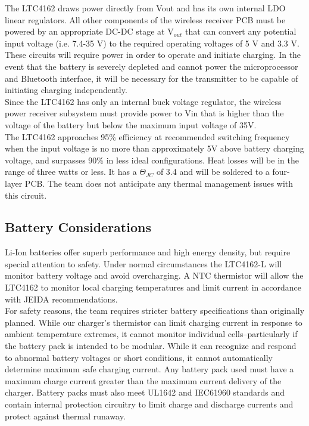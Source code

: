 \documentclass[12pt]{article}
\begin{document}
\indent
The LTC4162 draws power directly from Vout and has its own internal LDO linear regulators. All other components of the wireless receiver PCB must be powered by an appropriate DC-DC stage at V$_{out}$ that can convert any potential input voltage (i.e. 7.4-35 V) to the required operating voltages of 5 V and 3.3 V. These circuits will require power in order to operate and initiate charging. In the event that the battery is severely depleted and cannot power the microprocessor and Bluetooth interface, it will be necessary for the transmitter to be capable of initiating charging independently.\\

\indent
Since the LTC4162 has only an internal buck voltage regulator, the wireless power receiver subsystem must provide power to Vin that is higher than the voltage of the battery but below the maximum input voltage of 35V.\\

\indent
The LTC4162 approaches 95\% efficiency at recommended switching frequency when the input voltage is no more than approximately 5V above battery charging voltage, and surpasses 90\% in less ideal configurations. Heat losses will be in the range of three watts or less. It has a $\Theta_{JC}$ of 3.4  and will be soldered to a four-layer PCB. The team does not anticipate any thermal management issues with this circuit.

\subsection{Battery Considerations}

Li-Ion batteries offer superb performance and high energy density, but require special attention to safety. Under normal circumstances the LTC4162-L will monitor battery voltage and avoid overcharging. A NTC thermistor will allow the LTC4162 to monitor local charging temperatures and limit current in accordance with JEIDA recommendations.\\

\indent
For safety reasons, the team requires stricter battery specifications than originally planned. While our charger’s thermistor can limit charging current in response to ambient temperature extremes, it cannot monitor individual cells--particularly if the battery pack is intended to be modular. While it can recognize and respond to abnormal battery voltages or short conditions, it cannot automatically determine maximum safe charging current. Any battery pack used must have a maximum charge current greater than the maximum current delivery of the charger. Battery packs must also meet UL1642 and IEC61960 standards and contain internal protection circuitry to limit charge and discharge currents and protect against thermal runaway.\\
\end{document}
